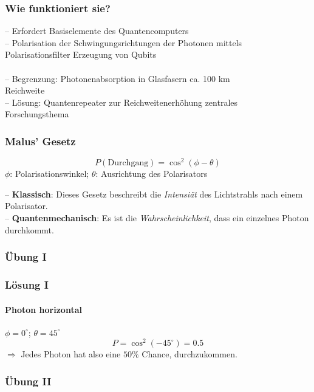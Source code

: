 \begin{frame}
	\frametitle{Wie funktioniert sie?}
	-- Erfordert Basiselemente des Quantencomputers\\
	-- Polarisation der Schwingungsrichtungen der Photonen mittels\\
		\hspace{0.5em} Polarisationsfilter \textrightarrow { }Erzeugung von Qubits\\
	\vspace{-2.5em}
	\hspace{9em}\\
	\vspace{-2.0em}
	-- Begrenzung: Photonenabsorption in Glasfasern \textrightarrow { }ca. 100 km\\
		\hspace{0.5em} Reichweite\\
	-- L{\"o}sung: Quantenrepeater zur Reichweitenerhöhung \textrightarrow { }zentrales\\
	\hspace{0.5em} Forschungsthema
\end{frame}

\begin{frame}
	\frametitle{Malus’ Gesetz}
	\begin{Definition}
		\[\mathit{P}(\text{Durchgang}) = \cos^2(\phi - \theta)\]
		$\phi$: Polarisationswinkel; $\theta$: Ausrichtung des Polarisators 
	\end{Definition}
	-- \textbf{Klassisch}: Dieses Gesetz beschreibt die \textit{Intensi{\"a}t} des Lichtstrahls nach einem Polarisator.\\
	-- \textbf{Quantenmechanisch}: Es ist die \textit{Wahrscheinlichkeit}, dass ein einzelnes Photon durchkommt.
\end{frame}

\begin{frame}
	\frametitle{{\"U}bung I}
\end{frame}

\begin{frame}
	\frametitle{L{\"o}sung I}
	\framesubtitle{Photon horizontal}
	$\phi = 0^\circ$; $\theta = 45^\circ$
	\[
		\mathit{P} = \cos^2(-45^\circ) = 0.5
	\]
	$\Rightarrow$ Jedes Photon hat also eine $50\%$ Chance, durchzukommen.
	
\end{frame}

\begin{frame}
	\frametitle{{\"U}bung II}
\end{frame}

